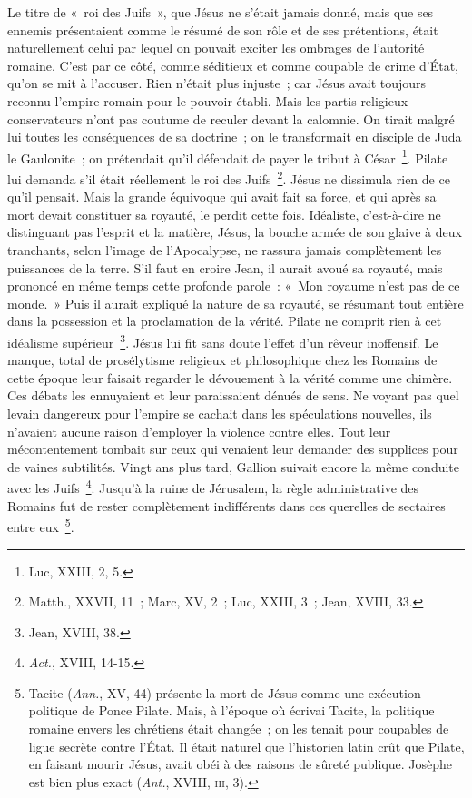 \documentclass[french,twoside]{book} %
\begin{document}
Le titre de « roi des Juifs », que Jésus ne s’était jamais donné, mais que ses ennemis présentaient comme le résumé de son rôle et de ses prétentions, était naturellement celui par lequel on pouvait exciter les ombrages de l’autorité romaine. C’est par ce côté, comme séditieux et comme coupable de crime d’État, qu’on se mit à l’accuser. Rien n’était plus injuste ; car Jésus avait toujours reconnu l’empire romain pour le pouvoir établi. Mais les partis religieux conservateurs n’ont pas coutume de reculer devant la calomnie. On tirait malgré lui toutes les conséquences de sa doctrine ; on le transformait en disciple de Juda le Gaulonite ; on prétendait qu’il défendait de payer le tribut à César \footnote{Luc, XXIII, 2, 5.}. Pilate lui demanda s’il était réellement le roi des Juifs \footnote{Matth., XXVII, 11 ; Marc, XV, 2 ; Luc, XXIII, 3 ; Jean, XVIII, 33.}. Jésus ne dissimula rien de ce qu’il pensait. Mais la grande équivoque qui avait fait sa force, et qui après sa mort devait constituer sa royauté, le perdit cette fois. Idéaliste, c’est-à-dire ne distinguant pas l’esprit et la matière, Jésus, la bouche armée de son glaive à deux tranchants, selon l’image de l’Apocalypse, ne rassura jamais complètement les puissances de la terre. S’il faut en croire Jean, il aurait avoué sa royauté, mais prononcé en même temps cette profonde parole : « Mon royaume n’est pas de ce monde. » Puis il aurait expliqué la nature de sa royauté, se résumant tout entière dans la possession et la proclamation de la vérité. Pilate ne comprit rien à cet idéalisme supérieur \footnote{Jean, XVIII, 38.}. Jésus lui fit sans doute l’effet d’un rêveur inoffensif. Le manque, total de prosélytisme religieux et philosophique chez les Romains de cette époque leur faisait regarder le dévouement à la vérité comme une chimère. Ces débats les ennuyaient et leur paraissaient dénués de sens. Ne voyant pas quel levain dangereux pour l’empire se cachait dans les spéculations nouvelles, ils n’avaient aucune raison d’employer la violence contre elles. Tout leur mécontentement tombait sur ceux qui venaient leur demander des supplices pour de vaines subtilités. Vingt ans plus tard, Gallion suivait encore la même conduite avec les Juifs \footnote{{\itshape Act.}, XVIII, 14-15.}. Jusqu’à la ruine de Jérusalem, la règle administrative des Romains fut de rester complètement indifférents dans ces querelles de sectaires entre eux \footnote{ Tacite ({\itshape Ann.}, XV, 44) présente la mort de Jésus comme une exécution politique de Ponce Pilate. Mais, à l’époque où écrivai Tacite, la politique romaine envers les chrétiens était changée ; on les tenait pour coupables de ligue secrète contre l’État. Il était naturel que l’historien latin crût que Pilate, en faisant mourir Jésus, avait obéi à des raisons de sûreté publique. Josèphe est bien plus exact ({\itshape Ant.}, XVIII, \textsc{iii}, 3).}.\par
\end{document}
